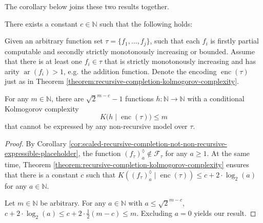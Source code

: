 The corollary below joins these two results together.



\begin{corollary}
	\label{cor:recursive-completion-models-cannot-express}
	There exists a constant $c\in\mathbb{N}$ such that the following holds:
	
	Given an arbitrary function set $\tau=\{f_1,\dots,f_j\}$, such that each $f_i$ is firstly partial computable and secondly strictly monotonously increasing or bounded. Assume that there is at least one $f_i\in\tau$ that is strictly monotonously increasing and has arity $\operatorname{ar}(f_i)>1$, e.g. the addition function.
	Denote the encoding $\operatorname{enc}(\tau)$ just as in Theorem \ref{theorem:recursive-completion-kolmogorov-complexity}.
	
	For any $m\in\mathbb{N}$, there are $\sqrt{2}^{m-c}-1$ functions $h:\mathbb{N}\to\mathbb{N}$ with a conditional Kolmogorov complexity 
	\begin{equation*}
		K\bigl(h\mid \operatorname{enc}(\tau)\bigr)\leq m
	\end{equation*}
	that cannot be expressed by any non-recursive model over $\tau$.
	
\end{corollary}
\begin{proof}
	By Corollary \ref{cor:scaled-recursive-completion-not-non-recursive-expressible-placeholder}, the function $\left(f_\tau\right)_a^{\lozenge}\notin\mathcal{F}_{\tau}$ for any $a\geq 1$.
	At the same time, Theorem \ref{theorem:recursive-completion-kolmogorov-complexity} ensures that there is a constant $c$ such that $K(\left(f_{\tau}\right)_{a}^{\lozenge}\mid \operatorname{enc}(\tau))\leq c+2\cdot\log_2(a)$ for any $a\in \mathbb{N}$.
	
	Let $m\in\mathbb{N}$ be arbitrary.
	For any $a\in\mathbb{N}$ with $a\leq \sqrt{2}^{m-c}$, $c+2\cdot\log_2(a)\leq  c + 2 \cdot \frac{1}{2}(m-c)\leq m$.
	Excluding $a=0$ yields our result.
\end{proof}

